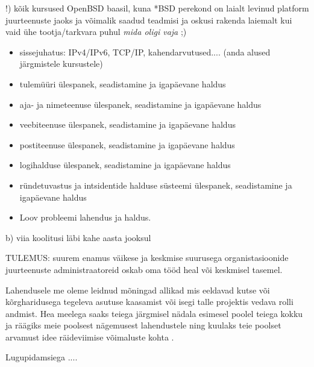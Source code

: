 \begin{spacing}{1}
!) kõik kursused OpenBSD baasil, kuna *BSD perekond on laialt levinud platform juurteenuste jaoks ja võimalik saadud teadmisi ja oskusi rakenda laiemalt kui vaid ühe tootja/tarkvara puhul \emph{mida oligi vaja} ;)

\begin{itemize}
	\item[0)] sissejuhatus: IPv4/IPv6, TCP/IP, kahendarvutused.... (anda alused järgmistele kursustele)
	\item[1)] tulemüüri ülespanek, seadistamine ja igapäevane haldus
	\item[2)] aja- ja nimeteenuse ülespanek, seadistamine ja igapäevane haldus
	\item[3)] veebiteenuse ülespanek, seadistamine ja igapäevane haldus
	\item[4)] postiteenuse ülespanek, seadistamine ja igapäevane haldus
	\item[5)] logihalduse ülespanek, seadistamine ja igapäevane haldus
	\item[6)] ründetuvastus ja intsidentide halduse süsteemi ülespanek, seadistamine ja igapäevane haldus
	\item[7)] Loov probleemi lahendus ja haldus.

\end{itemize}


b) viia koolitusi läbi kahe aasta jooksul

TULEMUS:
suurem enamus väikese ja keskmise suurusega organistasioonide juurteenuste administraatoreid oskab oma tööd heal või keskmisel tasemel.


Lahendusele me oleme leidnud mõningad allikad mis eeldavad kutse või kõrgharidusega tegeleva asutuse kaasamist või isegi talle projektis vedava rolli andmist.
Hea meelega saaks teiega järgmisel nädala esimesel poolel teiega kokku ja räägiks meie poolsest nägemusest lahendustele ning kuulaks teie poolset arvamust idee räideviimise võimaluste kohta .

Lugupidamsiega ....
\end{spacing}
\normalfont
